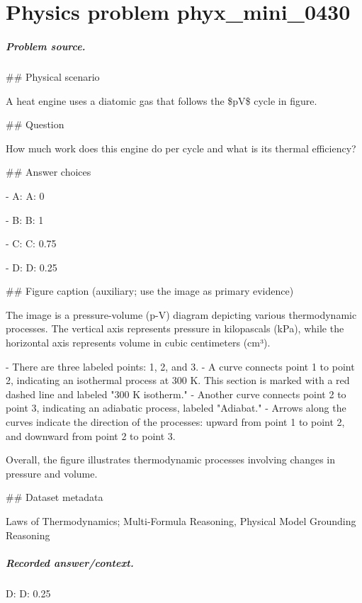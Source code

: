 
\chapter{Physics problem phyx\_mini\_0430}
\label{ch:PhyXMiniProblems_problem_phyx_mini_0430}

\paragraph{Problem source.}
\#\# Physical scenario

A heat engine uses a diatomic gas that follows the \$pV\$ cycle in figure.

\#\# Question

How much work does this engine do per cycle and what is its thermal efficiency?

\#\# Answer choices

- A: A: 0

- B: B: 1

- C: C: 0.75

- D: D: 0.25

\#\# Figure caption (auxiliary; use the image as primary evidence)

The image is a pressure-volume (p-V) diagram depicting various thermodynamic processes. The vertical axis represents pressure in kilopascals (kPa), while the horizontal axis represents volume in cubic centimeters (cm³).

- There are three labeled points: 1, 2, and 3.
- A curve connects point 1 to point 2, indicating an isothermal process at 300 K. This section is marked with a red dashed line and labeled "300 K isotherm."
- Another curve connects point 2 to point 3, indicating an adiabatic process, labeled "Adiabat."
- Arrows along the curves indicate the direction of the processes: upward from point 1 to point 2, and downward from point 2 to point 3.

Overall, the figure illustrates thermodynamic processes involving changes in pressure and volume.

\#\# Dataset metadata

Laws of Thermodynamics; Multi-Formula Reasoning, Physical Model Grounding Reasoning

\paragraph{Recorded answer/context.}
D: D: 0.25

